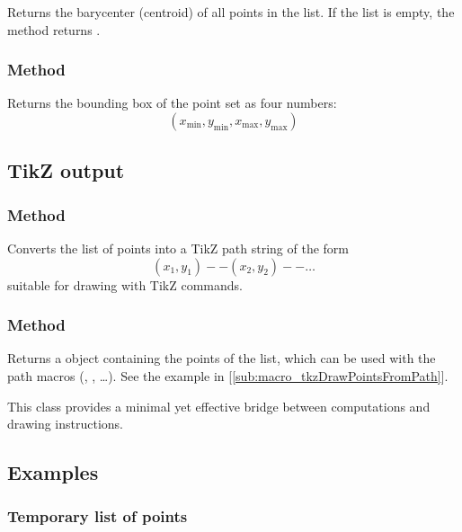 Returns the barycenter (centroid) of all points in the list.
If the list is empty, the method returns .

\subsubsection{Method }
\label{ssub:meth_list_point_bbox}

Returns the bounding box of the point set as four numbers:
\[
  (x_{\min}, y_{\min}, x_{\max}, y_{\max})
\]


\subsection{TikZ output}
\label{subsec:list_point_output}

\subsubsection{Method }
\label{ssub:meth_list_point_to_path}

Converts the list of points into a TikZ path string of the form
\[
  (x_1,y_1) -- (x_2,y_2) -- \dots
\]
suitable for drawing with TikZ commands.

\subsubsection{Method }
\label{ssub:meth_list_point_as_path}

Returns a  object containing the points of the list, which can be used with the path macros (, , \ldots). See the example in [\ref{sub:macro_tkzDrawPointsFromPath}].


\medskip

This class provides a minimal yet effective bridge between  computations and  drawing instructions.


\subsection{Examples}
\label{subsec:list_point_examples}

\subsubsection{Temporary list of points}
\label{ssub:list_point_example_local}

